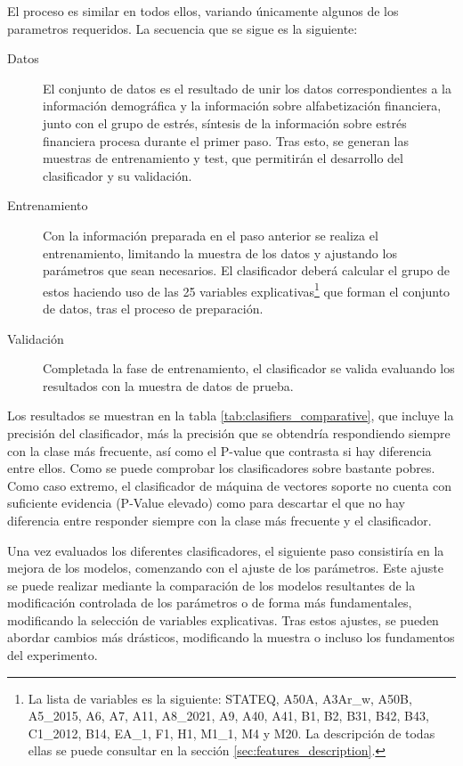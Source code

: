 \documentclass[a4paper, 11pt]{article}
\begin{document}
El proceso es similar en todos ellos, variando únicamente algunos de los parametros 
requeridos. La secuencia que se sigue es la siguiente:
\begin{description}
    \item[Datos] El conjunto de datos es el resultado de unir los 
    datos correspondientes a la información demográfica y la información sobre 
    alfabetización financiera, junto con el grupo de estrés, síntesis de la información
    sobre estrés financiera procesa durante el primer paso. Tras esto, se generan las
    muestras de entrenamiento y test, que permitirán el desarrollo del clasificador y
    su validación.
    \item[Entrenamiento] Con la información preparada en el paso anterior
    se realiza el entrenamiento, limitando la muestra de los datos y ajustando los parámetros
    que sean necesarios. El clasificador deberá calcular el grupo de estos haciendo uso de 
    las 25 variables explicativas\footnote{La lista de variables es la siguiente: STATEQ, A50A,
    A3Ar\_w, A50B, A5\_2015, A6, A7, A11, A8\_2021, A9, A40, A41, B1, B2, B31, B42, B43, C1\_2012,
    B14, EA\_1, F1, H1, M1\_1, M4 y M20. La descripción de todas ellas se puede consultar en la sección \ref{sec:features_description}.} que forman el conjunto de datos, tras el proceso de
    preparación. 
    \item[Validación] Completada la fase de entrenamiento, el clasificador se 
    valida evaluando los resultados con la muestra de datos de prueba.
\end{description}
Los resultados se muestran en la tabla \ref{tab:clasifiers_comparative}, que incluye la
precisión del clasificador, más la precisión que se obtendría respondiendo siempre con la
clase más frecuente, así como el P-value que contrasta si hay diferencia entre ellos. 
Como se puede comprobar los clasificadores sobre bastante pobres. Como caso extremo, el
clasificador de máquina de vectores soporte no cuenta con suficiente evidencia (P-Value 
elevado) como para descartar el que no hay diferencia entre responder siempre con la 
clase más frecuente y el clasificador.

Una vez evaluados los diferentes clasificadores, el siguiente paso consistiría en la mejora
de los modelos, comenzando con el ajuste de los parámetros. Este ajuste se puede realizar
mediante la comparación de los modelos resultantes de la modificación controlada de los 
parámetros o de forma más fundamentales, modificando la selección de variables explicativas.
Tras estos ajustes, se pueden abordar cambios más drásticos, modificando la muestra o incluso
los fundamentos del experimento.
\end{document}
